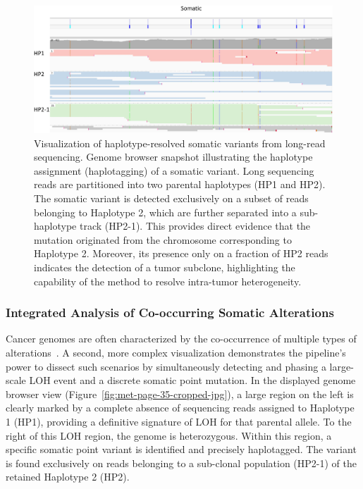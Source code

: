 \documentclass[pdflatex,sn-nature]{sn-jnl}
\def\pandocbounded#1{%
  \begingroup
  \setkeys{Gin}{width=1.0\linewidth,height=1.0\textheight,keepaspectratio}%
  #1%
  \endgroup
}
\begin{document}
\begin{figure}
\centering
\pandocbounded{\includegraphics[keepaspectratio]{page_34_cropped.jpg}}
\caption[Visualization of haplotype-resolved somatic variants from long-read sequencing.]{Visualization of haplotype-resolved somatic variants from long-read sequencing. Genome browser snapshot illustrating the haplotype assignment (haplotagging) of a somatic variant. Long sequencing reads are partitioned into two parental haplotypes (HP1 and HP2). The somatic variant is detected exclusively on a subset of reads belonging to Haplotype 2, which are further separated into a sub-haplotype track (HP2-1). This provides direct evidence that the mutation originated from the chromosome corresponding to Haplotype 2. Moreover, its presence only on a fraction of HP2 reads indicates the detection of a tumor subclone, highlighting the capability of the method to resolve intra-tumor heterogeneity.}
\label{fig:met-page-34-cropped-jpg}
\end{figure}

\subsubsection{Integrated Analysis of Co-occurring Somatic Alterations}\label{integrated-analysis-of-co-occurring-somatic-alterations}

Cancer genomes are often characterized by the co-occurrence of multiple types of alterations~\cite{sanchezvega2018, saiki2021}. A second, more complex visualization demonstrates the pipeline's power to dissect such scenarios by simultaneously detecting and phasing a large-scale LOH event and a discrete somatic point mutation. In the displayed genome browser view (Figure~\ref{fig:met-page-35-cropped-jpg}), a large region on the left is clearly marked by a complete absence of sequencing reads assigned to Haplotype 1 (HP1), providing a definitive signature of LOH for that parental allele. To the right of this LOH region, the genome is heterozygous. Within this region, a specific somatic point variant is identified and precisely haplotagged. The variant is found exclusively on reads belonging to a sub-clonal population (HP2-1) of the retained Haplotype 2 (HP2).
\end{document}
